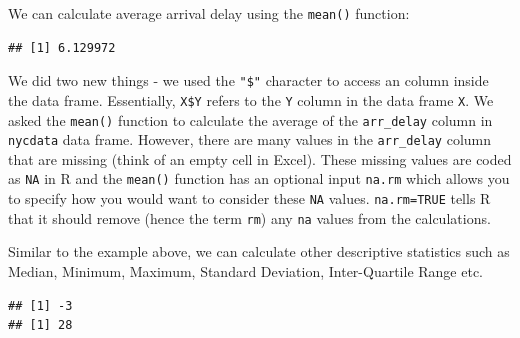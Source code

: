 \documentclass[11pt, letterpaper, twoside]{memoir}\usepackage{knitr}
\begin{document}
We can calculate average arrival delay using the \texttt{mean()}  function:

\begin{knitrout}
\color{fgcolor}\begin{kframe}
\begin{alltt}
\hlopt{$} \hlstd{=}\hlstd{)}
\end{alltt}
\begin{verbatim}
## [1] 6.129972
\end{verbatim}
\end{kframe}
\end{knitrout}

We did two new things - we used the \verb|"$"| character to access an column inside the data frame. Essentially, \verb|X$Y| refers to the \texttt{Y} column in the data frame \texttt{X}. We asked the \texttt{mean()} function to calculate the average of the \verb|arr_delay| column in \texttt{nycdata} data frame. However, there are many values in the \verb|arr_delay| column that are missing (think of an empty cell in Excel). These missing values are coded as \texttt{NA} in R and the \texttt{mean()} function has an optional input \texttt{na.rm} which allows you to specify how you would want to consider these \texttt{NA} values. \texttt{na.rm=TRUE} tells R that it should remove (hence the term \texttt{rm}) any \texttt{na} values from the calculations.

Similar to the example above, we can calculate other descriptive statistics such as Median, Minimum, Maximum, Standard Deviation, Inter-Quartile Range etc.

\begin{knitrout}
\color{fgcolor}\begin{kframe}
\begin{alltt}
\hlopt{$} \hlstd{=}\hlstd{);} \hlopt{$} \hlstd{=}\hlstd{)}
\end{alltt}
\begin{verbatim}
## [1] -3
## [1] 28
\end{verbatim}
\end{kframe}
\end{knitrout}
\end{document}
